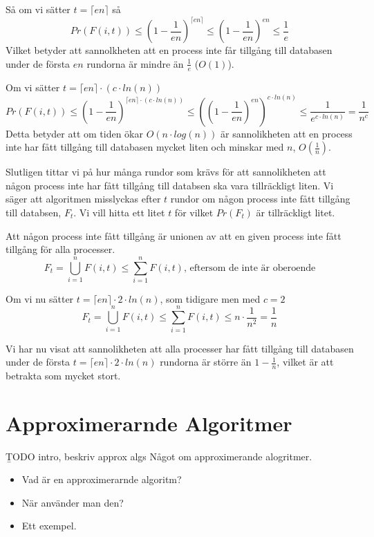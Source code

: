 \documentclass[a4paper]{report}
\begin{document}
Så om vi sätter $t = \lceil{}en\rceil$ så
\begin{equation}
	Pr(F(i,t)) \leq (1 - \frac{1}{en})^{\lceil{}en\rceil} \leq (1 -
	\frac{1}{en})^{en} \leq \frac{1}{e}
\end{equation}
Vilket betyder att sannolkheten att en process inte får tillgång till databasen
under de första $en$ rundorna är mindre än $\frac{1}{e}$ ($O(1)$).

Om vi sätter $t = \lceil{}en\rceil \cdot (c\cdot{}ln(n))$
\begin{equation}
	Pr(F(i,t)) \leq (1 - \frac{1}{en})^{\lceil{}en\rceil \cdot (c\cdot{}ln(n))}
	\leq ((1 - \frac{1}{en})^{en})^{c\cdot{}ln(n)} \leq
	\frac{1}{e^{c\cdot{}ln(n)}} = \frac{1}{n^c}
\end{equation}
Detta betyder att om tiden ökar $O(n\cdot{}log(n))$ är sannolikheten att en
process inte har fått tillgång till databasen mycket liten och minskar med $n$,
$O(\frac{1}{n})$.

Slutligen tittar vi på hur många rundor som krävs för att sannolikheten att
någon process inte har fått tillgång till databsen ska vara tillräckligt liten.
Vi säger att algoritmen misslyckas efter $t$ rundor om någon process inte fått
tillgång till databsen, $F_t$. Vi vill hitta ett litet $t$ för vilket $Pr(F_t)$
är tillräckligt litet.

Att någon process inte fått tillgång är unionen av att en given process inte
fått tillgång för alla processer.
\begin{equation}
	F_t = \bigcup_{i=1}^nF(i,t) \leq \sum_{i=1}^nF(i,t)\mbox{, eftersom de inte
	är oberoende}
\end{equation}

Om vi nu sätter $t = \lceil{}en\rceil \cdot 2\cdot{}ln(n)$, som tidigare men med $c = 2$
\begin{equation}
	F_t = \bigcup_{i=1}^nF(i,t) \leq \sum_{i=1}^nF(i,t) \leq n \cdot
	\frac{1}{n^2} =\frac{1}{n} 
\end{equation}

Vi har nu visat att sannolikheten att alla processer har fått tillgång till
databasen under de första $t = \lceil{}en\rceil \cdot 2\cdot{}ln(n)$ rundorna
är större än $1 - \frac{1}{n}$, vilket är att betrakta som mycket stort.


\section{Approximerarnde Algoritmer}

\b{TODO intro, beskriv approx algs}
Något om approximerande alogritmer.
\begin{itemize}
	\item Vad är en approximerarnde algoritm?
	\item När använder man den?
	\item Ett exempel.
\end{itemize}
\end{document}
